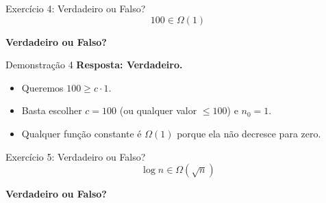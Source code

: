 \documentclass[aspectratio=169]{beamer}
\begin{document}
\begin{frame}{Exercício 4: Verdadeiro ou Falso?}
    \Large
    \[ 100 \in \Omega(1) \]
    \begin{center}
        \textbf{Verdadeiro ou Falso?}
    \end{center}
\end{frame}

\begin{frame}{Demonstração 4}
    \textbf{Resposta: Verdadeiro.}
    \begin{itemize}
        \item Queremos $100 \ge c \cdot 1$.
        \item Basta escolher $c = 100$ (ou qualquer valor $\le 100$) e $n_0 = 1$.
        \item Qualquer função constante é $\Omega(1)$ porque ela não decresce para zero.
    \end{itemize}
\end{frame}

\begin{frame}{Exercício 5: Verdadeiro ou Falso?}
    \Large
    \[ \log n \in \Omega(\sqrt{n}) \]
    \begin{center}
        \textbf{Verdadeiro ou Falso?}
    \end{center}
\end{frame}
\end{document}
